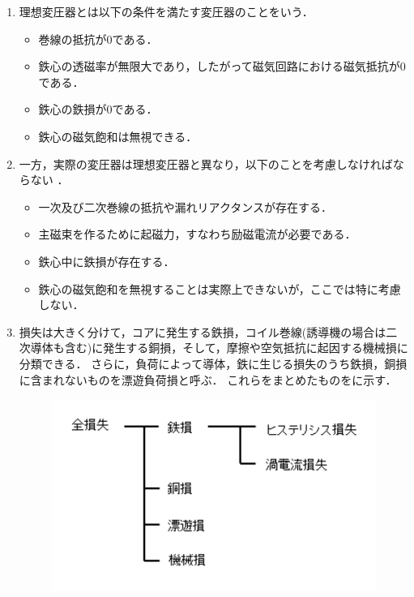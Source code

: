 \begin{enumerate}[1.]
	\item 理想変圧器とは以下の条件を満たす変圧器のことをいう\cite{1130000795154912128}．
\begin{itemize}
	\item 巻線の抵抗が0である．
	\item 鉄心の透磁率が無限大であり，したがって磁気回路における磁気抵抗が0である．
	\item 鉄心の鉄損が0である．
	\item 鉄心の磁気飽和は無視できる．
\end{itemize}
\item 一方，実際の変圧器は理想変圧器と異なり，以下のことを考慮しなければならない
\label{real}
\cite{1130154912128}．
\begin{itemize}
	\item 一次及び二次巻線の抵抗や漏れリアクタンスが存在する．
	\item 主磁束を作るために起磁力，すなわち励磁電流が必要である．
	\item 鉄心中に鉄損が存在する．
	\item 鉄心の磁気飽和を無視することは実際上できないが，ここでは特に考慮しない．
\end{itemize}
\item 損失は大きく分けて，コアに発生する鉄損，コイル巻線(誘導機の場合は二次導体も含む)に発生する銅損，そして，摩擦や空気抵抗に起因する機械損に分類できる．
さらに，負荷によって導体，鉄に生じる損失のうち鉄損，銅損に含まれないものを漂遊負荷損と呼ぶ．
これらをまとめたものをに示す．
\begin{figure}[h]
	\centering
	\includegraphics[scale=0.8]{./fig/loss_analysis.pdf}
	\caption{\cite{fdls}}
	\label{fig:loss_analysis}
\end{figure}
\end{enumerate}